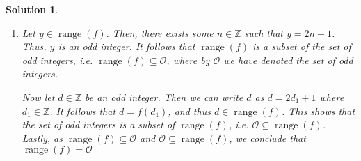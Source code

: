 \documentclass[12pt]{article}
\newtheorem{sol}[prop]{Solution}
\DeclareMathOperator{\range}{range}
\begin{document}
\begin{sol}
\begin{enumerate}
\begin{center}
\end{center}
\item[d)] Let $y\in \range(f)$. Then, there exists some $n\in \mathbb{Z}$ such that $y=2n+1$. Thus, $y$ is an odd integer. It follows that $\range(f)$ is a subset of the set of odd integers, i.e. $\range(f)\subseteq \mathcal{O}$, where by $\mathcal{O}$ we have denoted the set of odd integers.

Now let $d\in \mathbb{Z}$ be an odd integer. Then we can write $d$ as $d=2d_{1}+1$ where $d_{1}\in \mathbb{Z}$. It follows that $d=f(d_{1})$, and thus $d\in \range(f)$. This shows that the set of odd integers is a subset of $\range(f)$, i.e. $\mathcal{O}\subseteq \range(f)$. Lastly, as $\range(f)\subseteq \mathcal{O}$ and $\mathcal{O}\subseteq \range(f)$, we conclude that $\range(f)=\mathcal{O}$
\end{enumerate}
\end{sol}
\end{document}
